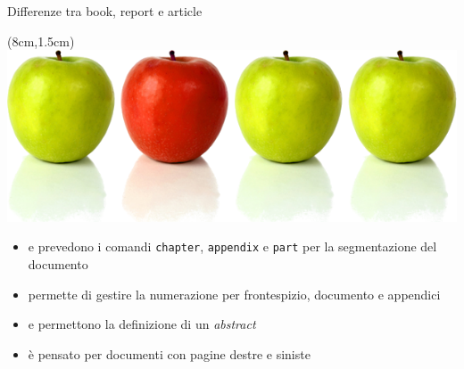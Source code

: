 \begin{frame}{Differenze tra book, report e article}

\begin{textblock*}{5cm}(8cm,1.5cm)
      \includegraphics[scale=0.20]{res/images/differenze}
\end{textblock*}

\begin{itemize}
	\item \mbook{} e \mreport{} prevedono i comandi \texttt{chapter}, 
	\texttt{appendix} e \texttt{part} per la segmentazione del documento
	\item \mbook{} permette di gestire la numerazione per frontespizio,
	documento e appendici
	\item \mreport{} e \marticle{} permettono la definizione di un 
	\emph{abstract}
	\item \mbook{} è pensato per documenti con pagine destre e siniste
\end{itemize}

\end{frame}